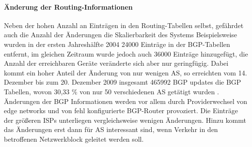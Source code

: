 \paragraph{Änderung der Routing-Informationen} 
Neben der hohen Anzahl an Einträgen in den Routing-Tabellen selbst, gefährdet auch die Anzahl der Änderungen die Skalierbarkeit des Systems Beispielsweise wurden in der ersten Jahreshälfte 2004 24000 Einträge in der BGP-Tabellen entfernt, im gleichen Zeitraum wurde jedoch auch 36000 Einträge hinzugefügt, die Anzahl der erreichbaren Geräte veränderte sich aber nur geringfügig. Dabei kommt ein hoher Anteil der Änderung von nur wenigen AS, so erreichten vom 14. Dezember bis zum 20. Dezember 2009 insgesamt 465992 BGP updates die BGP Tabellen, wovon 30,33 \% von nur 50 verschiedenen AS getätigt wurden \cite{Huston:aktuell:BGP}. Änderungen der BGP Informationen werden vor allem durch Providerwechsel von edge networks und von fehl konfigurierte BGP-Router provoziert. Die Einträge der größeren ISPs unterliegen vergleichsweise wenigen Änderungen. Hinzu kommt das Änderungen erst dann für AS interessant sind, wenn Verkehr in den betroffenen Netzwerkblock geleitet werden soll.


